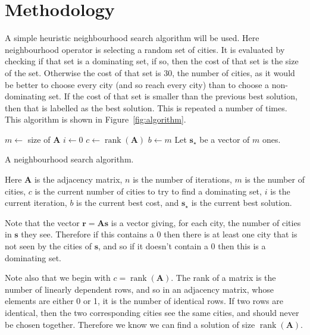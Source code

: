 \documentclass{article}
\begin{document}
\section{Methodology}
A simple heuristic neighbourhood search algorithm will be used.
Here neighbourhood operator is selecting a random set of cities.
It is evaluated by checking if that set is a dominating set, if so, then the cost of that set is the size of the set. Otherwise the cost of that set is 30, the number of cities, as it would be better to choose every city (and so reach every city) than to choose a non-dominating set.
If the cost of that set is smaller than the previous best solution, then that is labelled as the best solution.
This is repeated a number of times. This algorithm is shown in Figure~\ref{fig:algorithm}.

\begin{algorithm}
$m \gets$ size of $\mathbf{A}$\;
$i \gets 0$\;
$c \gets \operatorname{rank}(\mathbf{A})$\;
$b \gets m$\;
Let $\mathbf{s}_\star$ be a vector of $m$ ones.\;
\caption{A neighbourhood search algorithm.}
\label{fig:algorithm}
\end{algorithm}

Here $\mathbf{A}$ is the adjacency matrix, $n$ is the number of iterations, $m$ is the number of cities, $c$ is the current number of cities to try to find a dominating set, $i$ is the current iteration, $b$ is the current best cost, and $\mathbf{s}_\star$ is the current best solution.

Note that the vector $\mathbf{r} = \mathbf{A}\mathbf{s}$ is a vector giving, for each city, the number of cities in $\mathbf{s}$ they see. Therefore if this contains a $0$ then there is at least one city that is not seen by the cities of $\mathbf{s}$, and so if it doesn't contain a $0$ then this is a dominating set.

Note also that we begin with $c = \operatorname{rank}(\mathbf{A})$. The rank of a matrix is the number of linearly dependent rows, and so in an adjacency matrix, whose elements are either 0 or 1, it is the number of identical rows. If two rows are identical, then the two corresponding cities see the same cities, and should never be chosen together. Therefore we know we can find a solution of size $\operatorname{rank}(\mathbf{A})$.
\end{document}
